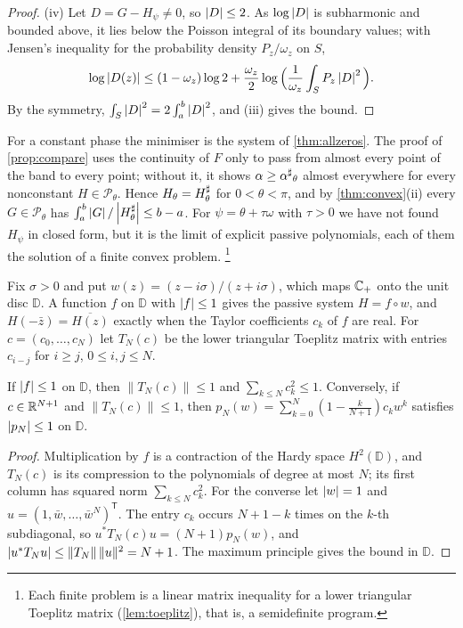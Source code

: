 \begin{proof}
(iv) Let $D=G-H_\psi\ne0$, so $\left|D\right|\le2$. As $\log\left|D\right|$ is subharmonic and
bounded above, it lies below the Poisson integral of its boundary values;
with Jensen's inequality for the probability density $P_z/\omega_z$ on $S$,
\[
\log\left|D(z)\right|\le(1-\omega_z)\log2+\frac{\omega_z}2\log\Big(\frac1{\omega_z}\int_SP_z\left|D\right|^2\Big).
\]
By the symmetry, $\int_S\left|D\right|^2=2\int_a^b\left|D\right|^2$, and (iii) gives the bound.
\end{proof}

For a constant phase the minimiser is the system of \cref{thm:allzeros}. The
proof of \cref{prop:compare} uses the continuity of $F$ only to pass from
almost every point of the band to every point; without it, it shows
$\alpha\ge{\alpha^{\sharp}}_\theta$ almost everywhere for every nonconstant $H\in\mathcal
P_\theta$. Hence $H_\theta=H^{\sharp}_\theta$ for $0<\theta<\pi$, and by
\cref{thm:convex}(ii) every $G\in\mathcal P_\theta$ has
$\int_a^b\left|G\right|/\left|H^{\sharp}_\theta\right|\le b-a$. For $\psi=\theta+\tau\omega$ with $\tau>0$
we have not found $H_\psi$ in closed form, but it is the limit of explicit
passive polynomials, each of them the solution of a finite convex problem.%
\footnote{Each finite problem is a linear matrix inequality for a lower
triangular Toeplitz matrix (\cref{lem:toeplitz}), that is, a semidefinite
program.}

Fix $\sigma>0$ and put $w(z)=(z-i\sigma)/(z+i\sigma)$, which maps $\mathbb C_{+}$ onto the
unit disc $\mathbb D$. A function $f$ on $\mathbb D$ with $\left|f\right|\le1$ gives the
passive system $H=f\circ w$, and $H(-\bar z)=\overline{H(z)}$ exactly when the
Taylor coefficients $c_k$ of $f$ are real. For $c=(c_0,\dots,c_N)$ let
$T_N(c)$ be the lower triangular Toeplitz matrix with entries $c_{i-j}$ for
$i\ge j$, $0\le i,j\le N$.

\begin{lemma}\label{lem:toeplitz}
If $\left|f\right|\le1$ on $\mathbb D$, then $\|T_N(c)\|\le1$ and
$\sum_{k\le N}c_k^2\le1$. Conversely, if $c\in\mathbb R^{N+1}$ and $\|T_N(c)\|\le1$,
then $p_N(w)=\sum_{k=0}^N(1-\frac k{N+1})c_kw^k$ satisfies $\left|p_N\right|\le1$ on
$\mathbb D$.
\end{lemma}

\begin{proof}
Multiplication by $f$ is a contraction of the Hardy space $H^2(\mathbb D)$, and
$T_N(c)$ is its compression to the polynomials of degree at most $N$; its
first column has squared norm $\sum_{k\le N}c_k^2$. For the converse let
$\left|w\right|=1$ and $u=(1,\bar w,\dots,\bar w^N)^{\mathsf T}$. The entry $c_k$ occurs
$N+1-k$ times on the $k$-th subdiagonal, so $u^*T_N(c)u=(N+1)p_N(w)$, and
$\left|u^*T_Nu\right|\le\|T_N\|\,\|u\|^2=N+1$. The maximum principle gives the bound
in $\mathbb D$.
\end{proof}

